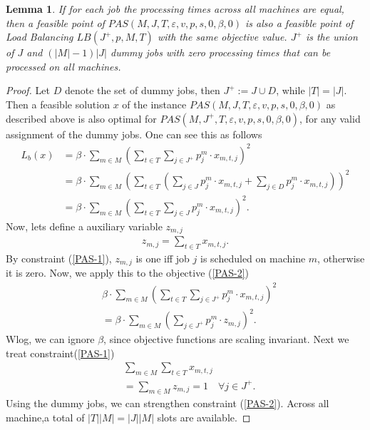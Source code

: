 \documentclass[12pt]{article}
\newtheorem{lemma}[theorem]{Lemma}
\begin{document}
\begin{lemma} \label{LMA-PAS-LB}
If for each job the processing times across all machines are equal, then a feasible point of  $PAS(M, J, T, \varepsilon, v, p, s, 0, \beta, 0)$ is also a feasible point of Load Balancing $LB(J^+, p, M, T)$ with the same objective value. $J^+$ is the union of $J$ and $(|M|-1)|J|$ dummy jobs with zero processing times that can be processed on all machines.
\end{lemma}
\begin{proof}
Let $D$ denote the set of dummy jobs, then $J^+ := J \cup D$, while $|T| = |J|$.
Then a feasible solution $x$ of the instance $PAS(M, J, T, \varepsilon, v, p, s, 0, \beta, 0)$ as described above is also optimal for $PAS(M, J^+, T, \varepsilon, v, p, s, 0, \beta, 0)$, for any valid assignment of the dummy jobs.
One can see this as follows
\begin{align*}
L_b(x) &= \beta \cdot \sum_{m \in M} \left( \sum_{t \in T} \sum_{j \in J^+} p^m_j \cdot x_{m,t,j} \right)^2 \\
&= \beta \cdot \sum_{m \in M} \left( \sum_{t \in T} \left(\sum_{j \in J} p^m_j \cdot x_{m,t,j} + \sum_{j \in D} p^m_j \cdot x_{m,t,j} \right)\right)^2 \\
&= \beta \cdot \sum_{m \in M} \left( \sum_{t \in T} \sum_{j \in J} p^m_j \cdot x_{m,t,j} \right)^2.
\end{align*}
Now, lets define a auxiliary variable $z_{m,j}$
\begin{gather*}
z_{m,j} = \sum_{t \in T} x_{m,t,j}.
\end{gather*}
By constraint (\ref{PAS-1}), $z_{m,j}$ is one iff job $j$ is scheduled on machine $m$, otherwise it is zero.
Now, we apply this to the objective (\ref{PAS-2})
\begin{align*}
 & \beta \cdot \sum_{m \in M} \left( \sum_{t \in T} \sum_{j \in J^+} p^m_j \cdot x_{m,t,j} \right)^2 \\
 & = \beta \cdot \sum_{m \in M} \left( \sum_{j \in J^+} p^m_j \cdot z_{m,j} \right)^2.
\end{align*}
Wlog, we can ignore $\beta$, since objective functions are scaling invariant.
Next we treat constraint(\ref{PAS-1})
\begin{align*}
&\sum_{m \in M} \sum_{t \in T} x_{m,t,j} \\
&= \sum_{m \in M} z_{m,j}= 1 \quad \forall j \in J^+. 
\end{align*}
Using the dummy jobs, we can strengthen constraint (\ref{PAS-2}).
Across all machine,a total of $|T||M| = |J||M|$ slots are available.

\end{proof}
\end{document}
